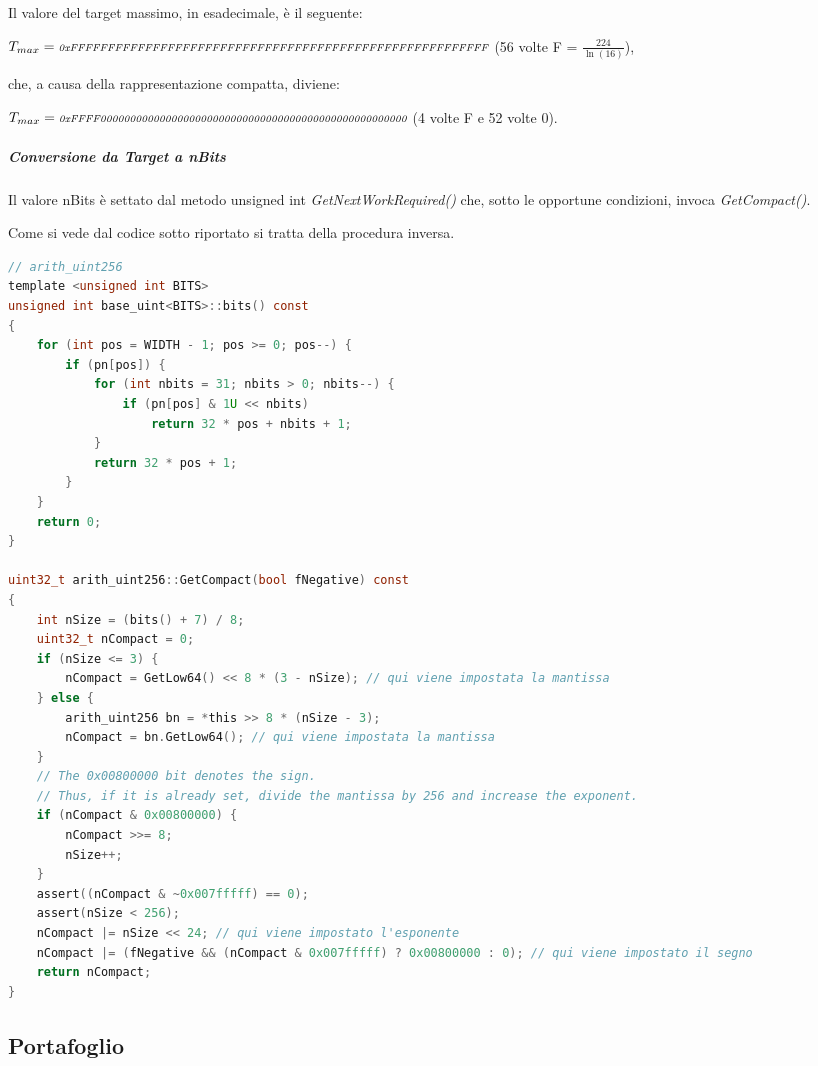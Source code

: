 \documentclass{article}
\begin{document}
Il valore del target massimo, in esadecimale, è il seguente:

$T_{max} = \textit{\scriptsize{0xFFFFFFFFFFFFFFFFFFFFFFFFFFFFFFFFFFFFFFFFFFFFFFFFFFFFFFFF}}$  (56 volte F = $\frac{224}{\ln(16)}$),

che, a causa della rappresentazione compatta, diviene:

$T_{max} = \textit{\scriptsize{0xFFFF0000000000000000000000000000000000000000000000000000}}$ (4 volte F e 52 volte 0).

\subparagraph{Conversione da Target a nBits}

Il valore nBits è settato dal metodo unsigned int \textit{GetNextWorkRequired()} che,
sotto le opportune condizioni, invoca \textit{GetCompact()}.

Come si vede dal codice sotto riportato si tratta della procedura inversa.

\lstset{style=mystyle}
\begin{lstlisting}[language=c]
// arith_uint256
template <unsigned int BITS>
unsigned int base_uint<BITS>::bits() const
{
    for (int pos = WIDTH - 1; pos >= 0; pos--) {
        if (pn[pos]) {
            for (int nbits = 31; nbits > 0; nbits--) {
                if (pn[pos] & 1U << nbits)
                    return 32 * pos + nbits + 1;
            }
            return 32 * pos + 1;
        }
    }
    return 0;
}

uint32_t arith_uint256::GetCompact(bool fNegative) const
{
    int nSize = (bits() + 7) / 8;
    uint32_t nCompact = 0;
    if (nSize <= 3) {
        nCompact = GetLow64() << 8 * (3 - nSize); // qui viene impostata la mantissa
    } else {
        arith_uint256 bn = *this >> 8 * (nSize - 3);
        nCompact = bn.GetLow64(); // qui viene impostata la mantissa
    }
    // The 0x00800000 bit denotes the sign.
    // Thus, if it is already set, divide the mantissa by 256 and increase the exponent.
    if (nCompact & 0x00800000) {
        nCompact >>= 8;
        nSize++;
    }
    assert((nCompact & ~0x007fffff) == 0);
    assert(nSize < 256);
    nCompact |= nSize << 24; // qui viene impostato l'esponente
    nCompact |= (fNegative && (nCompact & 0x007fffff) ? 0x00800000 : 0); // qui viene impostato il segno
    return nCompact;
}
\end{lstlisting}


\newpage
\subsection{Portafoglio}
\end{document}
